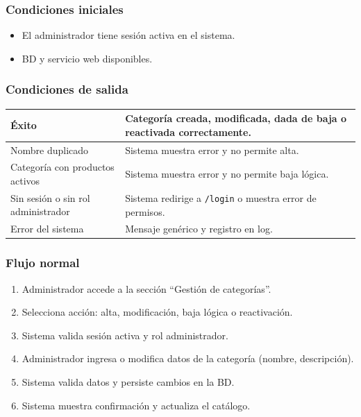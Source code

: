 \documentclass[12pt,a4paper]{article}
\begin{document}
\subsubsection*{Condiciones iniciales}
\begin{itemize}[label=--]
    \item El administrador tiene sesión activa en el sistema.
    \item BD y servicio web disponibles.
\end{itemize}

\subsubsection*{Condiciones de salida}
\begin{longtable}{|l|p{10cm}|}
    \hline
    Éxito                              & Categoría creada, modificada, dada de baja o reactivada correctamente. \\ \hline
    Nombre duplicado                   & Sistema muestra error y no permite alta.                               \\ \hline
    Categoría con productos activos    & Sistema muestra error y no permite baja lógica.                        \\ \hline
    Sin sesión o sin rol administrador & Sistema redirige a \texttt{/login} o muestra error de permisos.        \\ \hline
    Error del sistema                  & Mensaje genérico y registro en log.                                    \\ \hline
\end{longtable}

\subsubsection*{Flujo normal}
\begin{enumerate}[label=FN-\arabic*]
    \item Administrador accede a la sección “Gestión de categorías”.
    \item Selecciona acción: alta, modificación, baja lógica o reactivación.
    \item Sistema valida sesión activa y rol administrador.
    \item Administrador ingresa o modifica datos de la categoría (nombre, descripción).
    \item Sistema valida datos y persiste cambios en la BD.
    \item Sistema muestra confirmación y actualiza el catálogo.
\end{enumerate}
\end{document}
